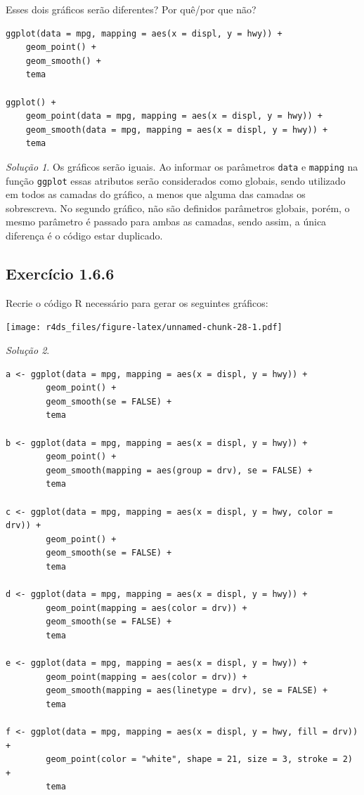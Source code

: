 \documentclass[
]{latex/krantz}
\theoremstyle{definition}
\theoremstyle{definition}
\theoremstyle{definition}
\theoremstyle{definition}
\theoremstyle{remark}
\newtheorem*{solution}{Solução}
\begin{document}
Esses dois gráficos serão diferentes? Por quê/por que não?

\begin{verbatim}
ggplot(data = mpg, mapping = aes(x = displ, y = hwy)) +
    geom_point() +
    geom_smooth() +
    tema
    
ggplot() + 
    geom_point(data = mpg, mapping = aes(x = displ, y = hwy)) +
    geom_smooth(data = mpg, mapping = aes(x = displ, y = hwy)) +
    tema
\end{verbatim}

\begin{solution}
Os gráficos serão iguais. Ao informar os parâmetros \texttt{data} e \texttt{mapping} na função \texttt{ggplot} essas atributos serão considerados como globais, sendo utilizado em todos as camadas do gráfico, a menos que alguma das camadas os sobrescreva. No segundo gráfico, não são definidos parâmetros globais, porém, o mesmo parâmetro é passado para ambas as camadas, sendo assim, a única diferença é o código estar duplicado.
\end{solution}

\hypertarget{exr1-6-6}{%
\subsection*{Exercício 1.6.6}\label{exr1-6-6}}

Recrie o código R necessário para gerar os seguintes gráficos:

\texttt{[image: r4ds\_files/figure-latex/unnamed-chunk-28-1.pdf]}

\begin{solution}
\leavevmode

\begin{verbatim}
a <- ggplot(data = mpg, mapping = aes(x = displ, y = hwy)) +
        geom_point() +
        geom_smooth(se = FALSE) +
        tema

b <- ggplot(data = mpg, mapping = aes(x = displ, y = hwy)) +
        geom_point() +
        geom_smooth(mapping = aes(group = drv), se = FALSE) +
        tema

c <- ggplot(data = mpg, mapping = aes(x = displ, y = hwy, color = drv)) +
        geom_point() +
        geom_smooth(se = FALSE) +
        tema

d <- ggplot(data = mpg, mapping = aes(x = displ, y = hwy)) +
        geom_point(mapping = aes(color = drv)) +
        geom_smooth(se = FALSE) +
        tema

e <- ggplot(data = mpg, mapping = aes(x = displ, y = hwy)) +
        geom_point(mapping = aes(color = drv)) +
        geom_smooth(mapping = aes(linetype = drv), se = FALSE) +
        tema

f <- ggplot(data = mpg, mapping = aes(x = displ, y = hwy, fill = drv)) +
        geom_point(color = "white", shape = 21, size = 3, stroke = 2) +
        tema
\end{verbatim}

\end{solution}
\end{document}
